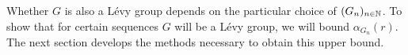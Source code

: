 Whether $G$ is also a L\'evy group depends on the particular choice of $(G_n)_{n\in\mathbb{N}}$. 
To show that for certain sequences $G$ will be a L\'evy group, we will bound $\alpha_{G_n}(r)$. 
The next section develops the methods necessary to obtain this upper bound.

